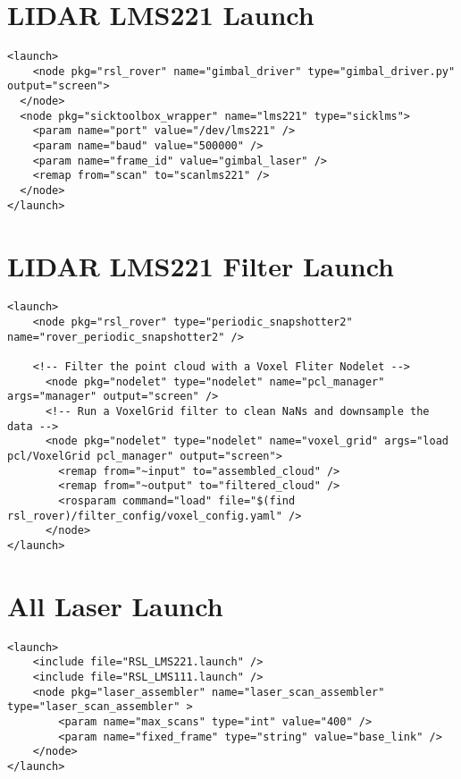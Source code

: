 \section*{LIDAR LMS221 Launch}
\begin{lstlisting}[breaklines=true,basicstyle=\tiny]
<launch>
	<node pkg="rsl_rover" name="gimbal_driver" type="gimbal_driver.py" output="screen">
  </node>
  <node pkg="sicktoolbox_wrapper" name="lms221" type="sicklms">
	<param name="port" value="/dev/lms221" />
	<param name="baud" value="500000" />
	<param name="frame_id" value="gimbal_laser" />
	<remap from="scan" to="scanlms221" /> 
  </node>
</launch>
\end{lstlisting}

\section*{LIDAR LMS221 Filter Launch}
\begin{lstlisting}[breaklines=true,basicstyle=\tiny]
<launch>
	<node pkg="rsl_rover" type="periodic_snapshotter2" name="rover_periodic_snapshotter2" />

	<!-- Filter the point cloud with a Voxel Fliter Nodelet -->
	  <node pkg="nodelet" type="nodelet" name="pcl_manager" args="manager" output="screen" />
	  <!-- Run a VoxelGrid filter to clean NaNs and downsample the data -->
	  <node pkg="nodelet" type="nodelet" name="voxel_grid" args="load pcl/VoxelGrid pcl_manager" output="screen">
		<remap from="~input" to="assembled_cloud" />
		<remap from="~output" to="filtered_cloud" />
		<rosparam command="load" file="$(find rsl_rover)/filter_config/voxel_config.yaml" />
	  </node>
</launch>
\end{lstlisting}


\section*{All Laser Launch}
\begin{lstlisting}[breaklines=true,basicstyle=\tiny]
<launch>
	<include file="RSL_LMS221.launch" />
	<include file="RSL_LMS111.launch" />
	<node pkg="laser_assembler" name="laser_scan_assembler" type="laser_scan_assembler" >
		<param name="max_scans" type="int" value="400" />
		<param name="fixed_frame" type="string" value="base_link" />
	</node>
</launch>
\end{lstlisting}

